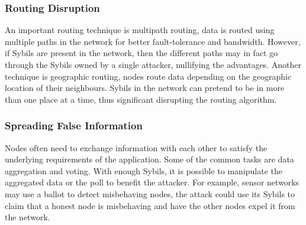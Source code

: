 \subsubsection{Routing Disruption}
An important routing technique is multipath routing, data is routed using
multiple paths in the network for better fault-tolerance and bandwidth. However,
if Sybils are present in the network, then the different paths may in fact go
through the Sybils owned by a single attacker, nullifying the advantages.
Another technique is geographic routing, nodes route data depending on the
geographic location of their neighbours. Sybils in the network can pretend to be
in more than one place at a time, thus significant disrupting the routing
algorithm\cite{karlof2003secure}.

\subsubsection{Spreading False Information}
Nodes often need to exchange information with each other to satisfy the
underlying requirements of the application. Some of the common tasks are data
aggregation and voting. With enough Sybils, it is possible to manipulate the
aggregated data or the poll to benefit the attacker. For example, sensor
networks may use a ballot to detect misbehaving nodes, the attack could use its
Sybils to claim that a honest node is misbehaving and have the other nodes expel
it from the network\cite{newsome2004sybil}.

